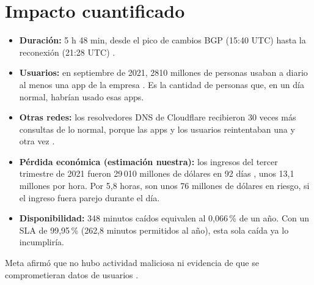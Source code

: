 \section{Impacto cuantificado}

\begin{itemize}[leftmargin=*,itemsep=1pt,topsep=2pt]
  \item \textbf{Duración:} 5 h 48 min, desde el pico de cambios BGP (15:40 UTC) hasta la reconexión (21:28 UTC) \cite{cloudflare2021}.
  \item \textbf{Usuarios:} en septiembre de 2021, 2810 millones de personas usaban a diario al menos una app de la empresa \cite{facebook_q3_2021}. Es la cantidad de personas que, en un día normal, habrían usado esas apps.
  \item \textbf{Otras redes:} los resolvedores DNS de Cloudflare recibieron 30 veces más consultas de lo normal, porque las apps y los usuarios reintentaban una y otra vez \cite{cloudflare2021}.
  \item \textbf{Pérdida económica (estimación nuestra):} los ingresos del tercer trimestre de 2021 fueron 29\,010 millones de dólares en 92 días \cite{facebook_q3_2021}, unos 13,1 millones por hora. Por 5,8 horas, son unos 76 millones de dólares en riesgo, si el ingreso fuera parejo durante el día.
  \item \textbf{Disponibilidad:} 348 minutos caídos equivalen al 0,066\,\% de un año. Con un SLA de 99,95\,\% (262,8 minutos permitidos al año), esta sola caída ya lo incumpliría.
\end{itemize}

Meta afirmó que no hubo actividad maliciosa ni evidencia de que se comprometieran datos de usuarios \cite{meta_actualizacion}.
